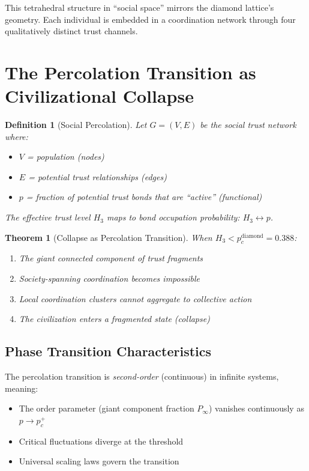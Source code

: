 \documentclass[11pt]{article}
\newtheorem{theorem}{Theorem}
\newtheorem{definition}{Definition}
\begin{document}
This tetrahedral structure in ``social space'' mirrors the diamond lattice's geometry. Each individual is embedded in a coordination network through four qualitatively distinct trust channels.

\section{The Percolation Transition as Civilizational Collapse}

\begin{definition}[Social Percolation]
Let $G = (V, E)$ be the social trust network where:
\begin{itemize}
\item $V$ = population (nodes)
\item $E$ = potential trust relationships (edges)
\item $p$ = fraction of potential trust bonds that are ``active'' (functional)
\end{itemize}
The effective trust level $H_3$ maps to bond occupation probability: $H_3 \leftrightarrow p$.
\end{definition}

\begin{theorem}[Collapse as Percolation Transition]
When $H_3 < p_c^{\text{diamond}} = 0.388$:
\begin{enumerate}
\item The giant connected component of trust fragments
\item Society-spanning coordination becomes impossible
\item Local coordination clusters cannot aggregate to collective action
\item The civilization enters a fragmented state (collapse)
\end{enumerate}
\end{theorem}

\subsection{Phase Transition Characteristics}

The percolation transition is \emph{second-order} (continuous) in infinite systems, meaning:

\begin{itemize}
\item The order parameter (giant component fraction $P_\infty$) vanishes continuously as $p \to p_c^+$
\item Critical fluctuations diverge at the threshold
\item Universal scaling laws govern the transition
\end{itemize}
\end{document}
